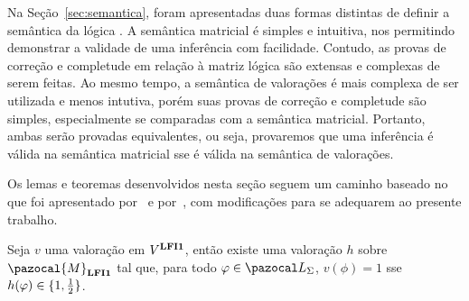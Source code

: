    Na Seção~\ref{sec:semantica}, foram apresentadas duas formas distintas de definir a semântica da lógica \lfium{}. A semântica matricial é simples e intuitiva, nos permitindo demonstrar a validade de uma inferência com facilidade. Contudo, as provas de correção e completude em relação à matriz lógica são extensas e complexas de serem feitas. Ao mesmo tempo, a semântica de valorações é mais complexa de ser utilizada e menos intutiva, porém suas provas de correção e completude são simples, especialmente se comparadas com a semântica matricial. Portanto, ambas serão provadas equivalentes, ou seja, provaremos que uma inferência é válida na semântica matricial sse é válida na semântica de valorações. 
    
    Os lemas e teoremas desenvolvidos nesta seção seguem um caminho baseado no que foi apresentado por~ e por~, com modificações para se adequarem ao presente trabalho.

    \begin{lema}\label{lem:matval}
        Seja $v$ uma valoração em $V^{{\normalfont\textbf{LFI1}}}$, então existe uma valoração $h$ sobre $\pazocal{M}_{\lfium}$ tal que, para todo $\phi \in \ling{}$, $v(\phi) = 1$ sse $h(\varphi) \in \{1, \frac{1}{2}{}\}$.
    \end{lema}

